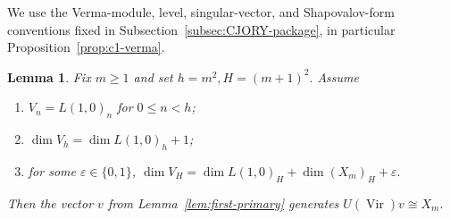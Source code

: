 \documentclass[12pt,leqno]{amsart}
\numberwithin{equation}{section} \newtheorem{thm}{Theorem}[section] \newtheorem{lem}[thm]{Lemma} \newtheorem{ex}[thm]{Example} \newtheorem{prop}[thm]{Proposition} \newtheorem{cor}[thm]{Corollary} \newtheorem{defi}[thm]{Definition} \newtheorem{rmk}[thm]{Remark} \newtheorem{notation}[thm]{Notation}
\newcommand{\Vir}{\operatorname{Vir}}
\begin{document}
We use the Verma-module, level, singular-vector, and Shapovalov-form conventions fixed in Subsection~\ref{subsec:CJORY-package}, in particular Proposition~\ref{prop:c1-verma}.

\begin{lem}\label{lem:first-singular}
Fix $m\ge1$ and set \(h=m^2,H=(m+1)^2.\) Assume
\begin{enumerate}[label=(\roman*),leftmargin=2.1em]
\item $V_n=L(1,0)_n$ for $0\le n<h$;
\item $\dim V_h=\dim L(1,0)_h+1$;
\item for some $\varepsilon\in\{0,1\}$, \(\dim V_H=\dim L(1,0)_H+\dim(X_m)_H+\varepsilon.\)
\end{enumerate}
Then the vector $v$ from Lemma~\ref{lem:first-primary} generates \(U(\Vir)v\cong X_m.\)
\end{lem}
\end{document}
